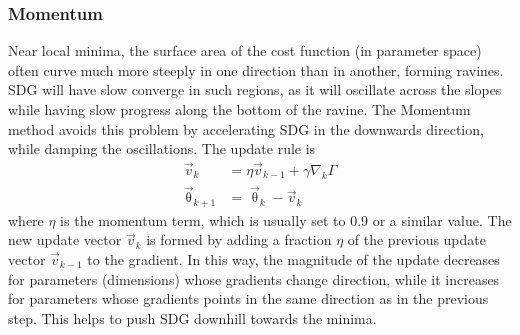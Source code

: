 \documentclass[twoside,english]{uiofysmaster}
\begin{document}
\subsubsection{Momentum}
Near local minima, the surface area of the cost function (in parameter space) often curve much more steeply in one 
direction than in another, forming ravines. SDG will have slow converge in such regions, as it will oscillate across the slopes
while having slow progress along the bottom of the ravine. The Momentum method \cite{Qian99} avoids this problem
by accelerating SDG in the downwards direction, while damping the oscillations. The update rule is
\begin{equation}
\begin{aligned}
 \vec{v}_{k} &= \eta \vec{v}_{k-1} + \gamma \nabla_k \Gamma \\
 \vec{\uptheta}_{k+1} &= \vec{\uptheta}_k - \vec{v}_k
\end{aligned}
\label{Momentum}
\end{equation}
where $\eta$ is the momentum term, which is usually set to 0.9 or a similar value. The new update vector $\vec{v}_k$ 
is formed by adding a fraction $\eta$ of the previous update vector $\vec{v}_{k-1}$ to the gradient. In this way, the magnitude
of the update decreases for parameters (dimensions) whose gradients change direction, while it increases for parameters
whose gradients points in the same direction as in the previous step. This helps to push SDG downhill towards the minima. 
\end{document}
